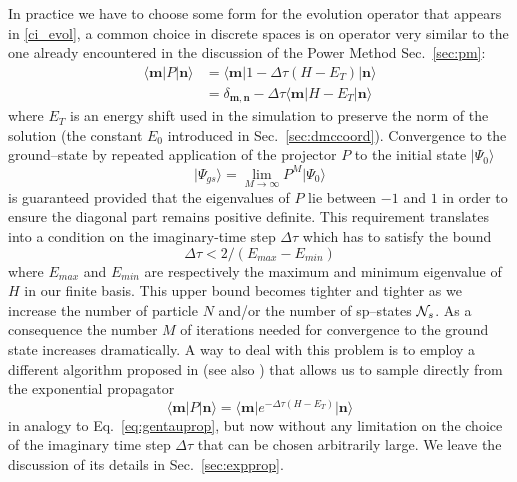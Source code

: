 In practice we have to choose some form for the evolution operator that appears in \eqref{ci_evol}, a common choice in 
discrete spaces is on operator very similar to the one already encountered in the discussion of the Power Method Sec.~\ref{sec:pm}:
\begin{equation}
\begin{split}
\label{eq:prop}
\langle \mathbf{m} \lvert P \rvert \mathbf{n} \rangle & = \langle \mathbf{m} \lvert 1 - \Delta\tau \left( H - E_T \right) \rvert \mathbf{n} \rangle \\
& = \delta_{\mathbf{m},\mathbf{n}} - \Delta\tau \langle \mathbf{m} \lvert H - E_T \rvert \mathbf{n} \rangle
\end{split}
\end{equation}
where $E_T$ is an energy shift used in the simulation to preserve the norm of the solution (the constant $E_0$ introduced in Sec.~\ref{sec:dmccoord}). 
Convergence to the ground--state by repeated application of the projector $P$ to the initial state $\rvert \Psi_0 \rangle$
\begin{equation}
\vert\Psi_{gs}\rangle = \lim_{M \to \infty} P^M \vert \Psi_0 \rangle
\end{equation}
is guaranteed provided that the eigenvalues of $P$ lie between $-1$ and $1$ in order to ensure the diagonal part remains positive definite.
This requirement translates into a condition on the imaginary-time step $\Delta\tau$ which has to satisfy the bound
\begin{equation}
\label{eq_bound_on_tau}
\Delta\tau < 2/(E_{max}-E_{min}) 
\end{equation}
where $E_{max}$ and $E_{min}$ are respectively the maximum and minimum eigenvalue of $H$ in our finite basis. This upper bound becomes 
tighter and tighter as we increase the number of particle $N$ and/or the number of sp--states ${\cal N}_s$. As a consequence the number $M$ of 
iterations needed for convergence to the ground state increases dramatically. A way to deal with this problem is to
employ a different algorithm proposed in \cite{Trivedi90} (see also \cite{TenHaaf95,Sorella00} ) that allows us to sample directly 
from the exponential propagator
\begin{equation}
\langle \mathbf{m} \lvert P \rvert \mathbf{n} \rangle = \langle \mathbf{m} \lvert e^{-\Delta\tau(H-E_T)} \rvert \mathbf{n} \rangle
\end{equation}
in analogy to Eq.~\eqref{eq:gentauprop}, but now without any limitation on the choice of the imaginary time step $\Delta \tau$ that can be chosen
arbitrarily large. We leave the discussion of its details in Sec.~\ref{sec:expprop}.

